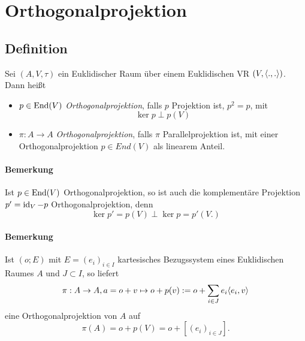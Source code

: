 \section{Orthogonalprojektion}
\subsection{Definition}
\begin{Definition}[Orthogonalprojektion ]
	Sei $ (A,V,\tau) $ ein Euklidischer Raum über einem Euklidischen VR $ (V, \langle .,. \rangle) $. Dann heißt
		\begin{itemize}
			\item $ p\in \operatorname{End}(V) $ \emph{Orthogonalprojektion}, falls $ p $ Projektion ist, $ p^2 = p $, mit
				\[ \ker p \perp p(V) \]
			\item $ \pi: A\to A $ \emph{Orthogonalprojektion}, falls $ \pi $ Parallelprojektion ist, mit einer Orthogonalprojektion $ p\in End(V) $ als linearem Anteil.
		\end{itemize}
\end{Definition}
\paragraph{Bemerkung}
	Ist $ p\in \operatorname{End}(V) $ Orthogonalprojektion, so ist auch die komplementäre Projektion $ p' = \operatorname{id}_V-p $ Orthogonalprojektion, denn
		\[ \ker p' = p(V)\perp \ker p = p'(V.) \]
\paragraph{Bemerkung}
	Ist $ (o;E) $ mit $ E=(e_i)_{i\in I} $ kartesisches Bezugssystem eines Euklidischen Raumes $ A $ und $ J\subset I $, so liefert
		\[ \pi: A\to A, a = o+v \mapsto o+p(v) := o+\sum_{i\in J}e_i\langle e_i,v \rangle \]
	eine Orthogonalprojektion von $ A $ auf
		\[ \pi(A) = o + p(V) = o + [(e_i)_{i\in J}]. \]